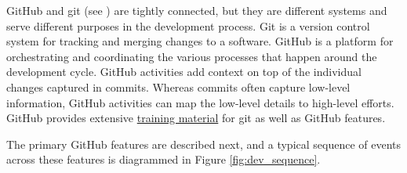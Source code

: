 \documentclass[]{nlr}
\begin{document}
GitHub and git (see ) are tightly connected, but they are different
systems and serve different purposes in the development process.
Git is a version control system for tracking and merging changes to a software.
GitHub is a platform for orchestrating and coordinating the various processes that happen
around the development cycle.
GitHub activities add context on top of the individual changes captured in commits.
Whereas commits often capture low-level information, GitHub activities can map the low-level
details to high-level efforts.
GitHub provides extensive \href{https://docs.github.com/en/get-started/quickstart/git-and-github-learning-resources}{training material}
for git as well as GitHub features.

The primary GitHub features are described next, and a typical sequence of events across these
features is diagrammed in Figure \ref{fig:dev_sequence}.
\end{document}
